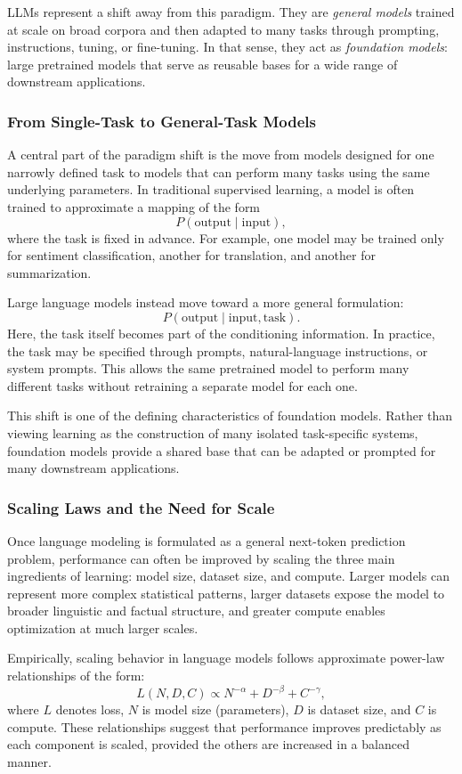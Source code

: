 \documentclass{article}
\begin{document}
LLMs represent a shift away from this paradigm. They are \emph{general models} trained at scale on broad corpora and then adapted to many tasks through prompting, instructions, tuning, or fine-tuning. In that sense, they act as \emph{foundation models}: large pretrained models that serve as reusable bases for a wide range of downstream applications.

\subsubsection{From Single-Task to General-Task Models}
A central part of the paradigm shift is the move from models designed for one narrowly defined task to models that can perform many tasks using the same underlying parameters. In traditional supervised learning, a model is often trained to approximate a mapping of the form
\[
P(\text{output}\mid \text{input}),
\]
where the task is fixed in advance. For example, one model may be trained only for sentiment classification, another for translation, and another for summarization.

Large language models instead move toward a more general formulation:
\[
P(\text{output}\mid \text{input}, \text{task}).
\]
Here, the task itself becomes part of the conditioning information. In practice, the task may be specified through prompts, natural-language instructions, or system prompts. This allows the same pretrained model to perform many different tasks without retraining a separate model for each one.

This shift is one of the defining characteristics of foundation models. Rather than viewing learning as the construction of many isolated task-specific systems, foundation models provide a shared base that can be adapted or prompted for many downstream applications.

\subsubsection{Scaling Laws and the Need for Scale}
Once language modeling is formulated as a general next-token prediction problem, performance can often be improved by scaling the three main ingredients of learning: model size, dataset size, and compute. Larger models can represent more complex statistical patterns, larger datasets expose the model to broader linguistic and factual structure, and greater compute enables optimization at much larger scales.

Empirically, scaling behavior in language models follows approximate power-law relationships \cite{kaplan2020scaling} of the form:
\[
L(N, D, C) \propto N^{-\alpha} + D^{-\beta} + C^{-\gamma},
\]
where $L$ denotes loss, $N$ is model size (parameters), $D$ is dataset size, and $C$ is compute. These relationships suggest that performance improves predictably as each component is scaled, provided the others are increased in a balanced manner.
\end{document}
